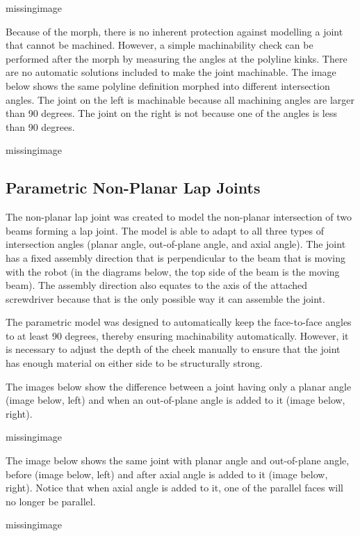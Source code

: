 missingimage

Because of the morph, there is no inherent protection against modelling a joint that cannot be machined. However, a simple machinability check can be performed after the morph by measuring the angles at the polyline kinks. There are no automatic solutions included to make the joint machinable. The image below shows the same polyline definition morphed into different intersection angles. The joint on the left is machinable because all machining angles are larger than 90 degrees. The joint on the right is not because one of the angles is less than 90 degrees. 

missingimage

\subsection{Parametric Non-Planar Lap Joints}
\label{subsection:exploration_4_parametric_non_planar_lap_joints}

The non-planar lap joint was created to model the non-planar intersection of two beams forming a lap joint. The model is able to adapt to all three types of intersection angles (planar angle, out-of-plane angle, and axial angle). The joint has a fixed assembly direction that is perpendicular to the beam that is moving with the robot (in the diagrams below, the top side of the beam is the moving beam). The assembly direction also equates to the axis of the attached screwdriver because that is the only possible way it can assemble the joint.

The parametric model was designed to automatically keep the face-to-face angles to at least 90 degrees, thereby ensuring machinability automatically. However, it is necessary to adjust the depth of the cheek manually to ensure that the joint has enough material on either side to be structurally strong.

The images below show the difference between a joint having only a planar angle (image below, left) and when an out-of-plane angle is added to it (image below, right).

missingimage

The image below shows the same joint with planar angle and out-of-plane angle, before (image below, left) and after axial angle is added to it (image below, right). Notice that when axial angle is added to it, one of the parallel faces will no longer be parallel. 

missingimage

